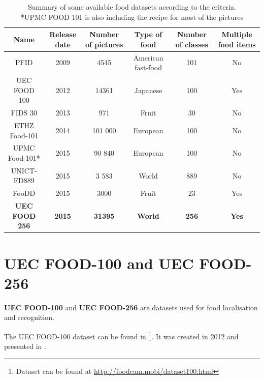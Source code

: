 \begin{table}
    \renewcommand{\arraystretch}{1.1} %
    \begin{tabulary}{\textwidth}{| c | C | C | C | C | C|}
        \hline
        Name & Release date & Number of pictures & Type of food & Number of classes & Multiple food items \\
        \hline
        PFID \cite{Chen2009} & 2009 & 4545 & American fast-food  & 101 & No \\
        \hline
        UEC FOOD 100 \cite{Matsuda2012a} & 2012 & 14361 & Japanese & 100  & Yes \\
        \hline
        FIDS 30 \cite{FIDS30} & 2013 & 971 & Fruit & 30 & No \\
        \hline
        ETHZ Food-101 \cite{Bossard2014} & 2014 & 101 000 & European & 100 & No \\
        \hline
        UPMC Food-101* \cite{Wang2015} & 2015 & 90 840 & European & 100 & No \\
        \hline
        UNICT-FD889 \cite{Farinella2015} & 2015 & 3 583 & World & 889 & No \\
        \hline
        FooDD \cite{ParisaPouladzadehAbdulsalamYassine2015} & 2015 & 3000 & Fruit & 23 & Yes \\
        \hline
        \textbf{UEC FOOD 256} \cite{Kawano2015} & \textbf{2015} & \textbf{31395} & \textbf{World} & \textbf{256}  & \textbf{Yes} \\ 
        \hline
    \end{tabulary}
    \caption[Summary of some available food datasets according to the criteria]{Summary of some available food datasets according to the criteria. \\
        *UPMC FOOD 101 is also including the recipe for most of the pictures}
    \label{table:dataset_summary}
\end{table}

\section{UEC FOOD-100 and UEC FOOD-256}

\textbf{UEC FOOD-100} and \textbf{UEC FOOD-256} are datasets used for food localisation and recognition.

The UEC FOOD-100 dataset can be found in \footnote{Dataset can be found at \url{http://foodcam.mobi/dataset100.html}}. It was created in 2012 and presented in \cite{Matsuda2012a}.

